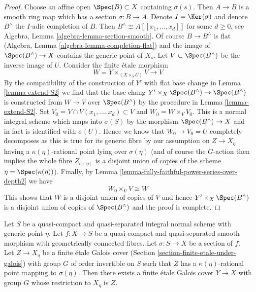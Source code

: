 \begin{proof}
\medskip\noindent
Choose an affine open $\Spec(B) \subset X$ containing $\sigma(s)$.
Then $A \to B$ is a smooth ring map which has a section $\sigma : B \to A$.
Denote $I = \Ker(\sigma)$ and denote $B^\wedge$ the
$I$-adic completion of $B$. Then $B^\wedge \cong A[[x_1, \ldots, x_d]]$
for some $d \geq 0$, see
Algebra, Lemma \ref{algebra-lemma-section-smooth}.
Of course $B \to B^\wedge$ is flat
(Algebra, Lemma \ref{algebra-lemma-completion-flat})
and the image of $\Spec(B^\wedge) \to X$ contains the generic point of $X_s$.
Let $V \subset \Spec(B^\wedge)$ be the inverse image of $U$.
Consider the finite \'etale morphism
$$
W = Y \times_{(X \times_S U)} V \longrightarrow V
$$
By the compatibility of the construction of $Y'$
with flat base change in Lemma \ref{lemma-extend-S2}
we find that the base chang
$Y' \times_X \Spec(B^\wedge) \to \Spec(B^\wedge)$
is constructed from $W \to V$ over $\Spec(B^\wedge)$
by the procedure in Lemma \ref{lemma-extend-S2}.
Set $V_0 = V \cap V(x_1, \ldots, x_d) \subset V$ and $W_0 = W \times_V V_0$.
This is a normal integral scheme which maps into $\sigma(S)$
by the morphism $\Spec(B^\wedge) \to X$ and in fact is identified
with $\sigma(U)$. Hence we know that $W_0 \to V_0 = U$ completely decomposes
as this is true for its generic fibre by our assumption
on $Z \to X_\eta$ having a $\kappa(\eta)$-rational point lying over
$\sigma(\eta)$ (and of course the $G$-action then implies the whole
fibre $Z_{\sigma(\eta)}$ is a disjoint union of copies of
the scheme $\eta = \Spec(\kappa(\eta))$).
Finally, by
Lemma \ref{lemma-fully-faithful-power-series-over-depth2}
we have
$$
W_0 \times_U V \cong W
$$
This shows that $W$ is a disjoint union of copies of $V$
and hence $Y' \times_X \Spec(B^\wedge)$ is a disjoint
union of copies of $\Spec(B^\wedge)$ and the proof is complete.
\end{proof}

\begin{lemma}
\label{lemma-extend-covering-general}
Let $S$ be a quasi-compact and quasi-separated integral normal scheme
with generic point $\eta$. Let $f : X \to S$ be a quasi-compact and
quasi-separated smooth morphism with geometrically connected fibres.
Let $\sigma : S \to X$ be a section of $f$. Let $Z \to X_\eta$ be a
finite \'etale Galois cover (Section \ref{section-finite-etale-under-galois})
with group $G$ of order invertible on $S$ such that
$Z$ has a $\kappa(\eta)$-rational point mapping to $\sigma(\eta)$.
Then there exists a finite \'etale Galois cover $Y \to X$ with group $G$
whose restriction to $X_\eta$ is $Z$.
\end{lemma}

